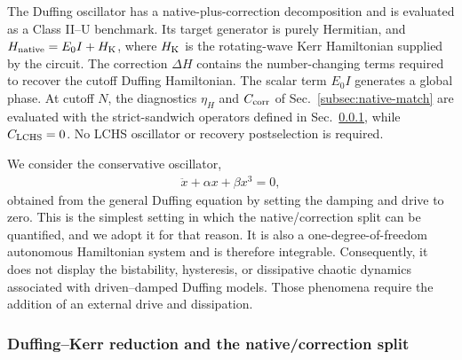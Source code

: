 \documentclass[pra,twocolumn,superscriptaddress,nofootinbib,floatfix]{revtex4-2}
\theoremstyle{remark}
\begin{document}
The Duffing oscillator has a native-plus-correction decomposition and is evaluated as a Class II--U benchmark. Its target generator is purely Hermitian, and \(H_{\rm native}=E_0I+H_{\rm K}\), where \(H_{\rm K}\) is the rotating-wave Kerr Hamiltonian supplied by the circuit. The correction \(\Delta H\) contains the number-changing terms required to recover the cutoff Duffing Hamiltonian. The scalar term \(E_0I\) generates a global phase. At cutoff \(N\), the diagnostics \(\eta_H\) and \(C_{\rm corr}\) of Sec.~\ref{subsec:native-match} are evaluated with the strict-sandwich operators defined in Sec.~\ref{subsec:df-reduction}, while \(C_{\rm LCHS}=0\). No LCHS oscillator or recovery postselection is required.

We consider the conservative oscillator,
\begin{align}
\ddot x+\alpha x+\beta x^3=0,
\end{align}
obtained from the general Duffing equation by setting the damping and drive to zero. This is the simplest setting in which the native/correction split can be quantified, and we adopt it for that reason. It is also a one-degree-of-freedom autonomous Hamiltonian system and is therefore integrable. Consequently, it does not display the bistability, hysteresis, or dissipative chaotic dynamics associated with driven--damped Duffing models. Those phenomena require the addition of an external drive and dissipation.

\subsubsection{Duffing--Kerr reduction and the native/correction split}
\label{subsec:df-reduction}
\end{document}
